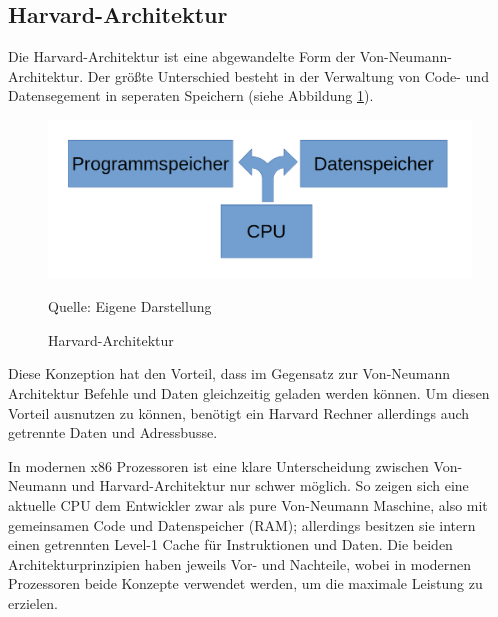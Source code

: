 \documentclass[a4paper,12pt]{article}
\begin{document}
\subsection{Harvard-Architektur} 
Die Harvard-Architektur ist eine abgewandelte Form der Von-Neumann-Architektur. Der größte Unterschied besteht in der Verwaltung von Code- und Datensegement in seperaten Speichern (siehe Abbildung \ref{fig:harvard}).

\begin{figure}[!htb]
\centering
\includegraphics[scale=0.30]{harvard}
\caption{Harvard-Architektur}
\centering
\small Quelle: Eigene Darstellung
\label{fig:harvard}
\end{figure}


\noindent Diese Konzeption hat den Vorteil, dass im Gegensatz zur Von-Neumann Architektur Befehle und Daten gleichzeitig geladen werden können. Um diesen Vorteil ausnutzen zu können, benötigt ein Harvard Rechner allerdings auch getrennte Daten und Adressbusse. 
\par\bigskip
\noindent In modernen x86 Prozessoren ist eine klare Unterscheidung zwischen Von-Neumann und Harvard-Architektur nur schwer möglich. So zeigen sich eine aktuelle CPU dem Entwickler zwar als pure Von-Neumann Maschine, also mit gemeinsamen Code und Datenspeicher (RAM); allerdings besitzen sie intern einen getrennten Level-1 Cache für Instruktionen und Daten. Die beiden Architekturprinzipien haben jeweils Vor- und Nachteile, wobei in modernen Prozessoren beide Konzepte verwendet werden, um die maximale Leistung zu erzielen.
\end{document}
